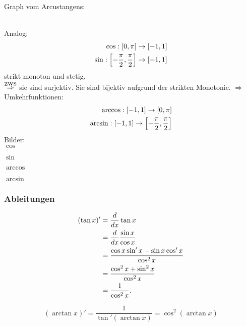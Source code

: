 \documentclass[../ana2.tex]{subfiles}
\begin{document}
Graph vom Arcustangens:\\
\begin{tikzpicture}
    
\end{tikzpicture}\\
Analog: 
\begin{align*}
    \abb{\cos}{[0,\pi]}{[-1,1]} \\
    \abb{\sin}{\left[-\frac{\pi}{2}, \frac{\pi}{2}\right]}{[-1,1]}
\end{align*}
strikt monoton und stetig.\\
\( \oversett{ZWS}{\Rightarrow} \) sie sind surjektiv.
Sie sind bijektiv aufgrund der strikten Monotonie.
\( \Rightarrow \) Umkehrfunktionen:
\begin{align*}
    \abb{\arccos}{[-1,1]}{[0,\pi]} \\
    \abb{\arcsin}{[-1,1]}{\left[-\frac{\pi}{2},\frac{\pi}{2}\right]}
\end{align*}
Bilder:\\
\( \cos \)
\begin{tikzpicture}
    
\end{tikzpicture}
\( \sin \)
\begin{tikzpicture}
    
\end{tikzpicture}
\( \arccos \)
\begin{tikzpicture}
    
\end{tikzpicture}
\( \arcsin \)
\begin{tikzpicture}
    
\end{tikzpicture}

\subsubsection*{Ableitungen}
\begin{align*}
    (\tan x)' &= \ddx{x} \tan x \\
    &= \ddx{x} \frac{\sin x}{\cos x}\\
    &= \frac{\cos x \sin'x - \sin x \cos'x}{\cos^2 x}\\
    &= \frac{\cos^2 x + \sin^2 x}{\cos^2 x} \\
    &= \frac{1}{\cos^2 x}.
\end{align*}

\[ (\arctan x)' = \frac{1}{\tan'(\arctan x)} 
= \cos^2(\arctan x) \]
\end{document}
